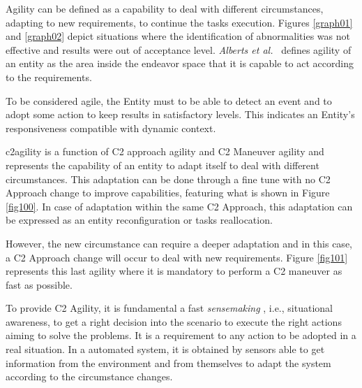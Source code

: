 Agility can be defined as a capability to deal with different circumstances, adapting to new requirements, to continue the tasks execution. Figures \ref{graph01} and \ref{graph02} depict situations where the identification of abnormalities was not effective and results were out of acceptance level. \textit{Alberts et al.}~\cite{Alberts2011} defines agility of an entity as the area inside the endeavor space that it is capable to act according to the requirements.

%
%

To be considered agile, the Entity must to be able to detect an event and to adopt some action to keep results in satisfactory levels. This indicates an Entity's responsiveness compatible with dynamic \gls{context}.

\gls{c2agility} is a function of C2 approach agility and \gls{C2 Maneuver} agility and represents the capability of an entity to adapt itself to deal with different circumstances. This adaptation can be done through a fine tune with no C2 Approach change to improve capabilities, featuring what is shown in Figure \ref{fig100}. In case of adaptation within the same C2 Approach, this adaptation can be expressed as an entity reconfiguration or tasks reallocation.

However, the new circumstance can require a deeper adaptation and in this case, a C2 Approach change will occur to deal with new requirements. Figure \ref{fig101} represents this last agility where it is mandatory to perform a C2 maneuver as fast as possible.

To provide C2 Agility, it is fundamental a fast \textit{sensemaking} \cite{Power01}, i.e., situational awareness, to get a right decision into the scenario to execute the right actions aiming to solve the problems. It is a requirement to any action to be adopted in a real situation. In a automated system, it is obtained by sensors able to get information from the environment and from themselves to adapt the system according to the circumstance changes. 

%
%

